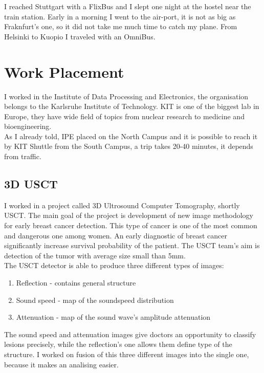 \documentclass[english]{article}
\begin{document}
I reached Stuttgart with a FlixBus and I slept one night at the hostel near the train station. Early in a morning I went to the air-port, it is not as big as Fraknfurt's one, so it did not take me much time to catch my plane. From Helsinki to Kuopio I traveled with an OmniBus.

\section{Work Placement}

I worked in the Institute of Data Processing and Electronics, the organisation belongs to the Karlsruhe Institute of Technology. KIT is one of the biggest lab in Europe, they have wide field of topics from nuclear research to medicine and bioengineering.\\

As I already told, IPE placed on the North Campus and it is possible to reach it by KIT Shuttle from the South Campus, a trip takes 20-40 minutes, it depends from traffic. 

\subsection{3D USCT}

I worked in a project called 3D Ultrosound Computer Tomography, shortly USCT. The main goal of the project is development of new image methodology for early breast cancer detection. This type of cancer is one of the most common and dangerous one among women. An early diagnostic of breast cancer significantly increase survival probability of the patient. The USCT team's aim is detection of the tumor with average size small than 5mm.\\

The USCT detector is able to produce three different types of images:

\begin{enumerate}
\item Reflection - contains general structure
\item Sound speed - map of the soundspeed distribution
\item Attenuation - map of the sound wave's amplitude attenuation
\end{enumerate}

The sound speed and attenuation images give doctors an opportunity to classify lesions precisely, while the reflection's one allows them define type of the structure. I worked on fusion of this three different images into the single one, because it makes an analising easier.\\
\end{document}
